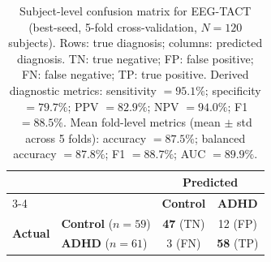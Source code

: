\begin{table}[ht]
\centering
\caption{Subject-level confusion matrix for EEG-TACT (best-seed, 5-fold cross-validation, $N = 120$ subjects). Rows: true diagnosis; columns: predicted diagnosis. TN: true negative; FP: false positive; FN: false negative; TP: true positive. Derived diagnostic metrics: sensitivity $= 95.1\%$; specificity $= 79.7\%$; PPV $= 82.9\%$; NPV $= 94.0\%$; F1 $= 88.5\%$. Mean fold-level metrics (mean $\pm$ std across 5 folds): accuracy $= 87.5\%$; balanced accuracy $= 87.8\%$; F1 $= 88.7\%$; AUC $= 89.9\%$.}
\label{tab:subject_cm}
\begin{tabular}{llcc}
\toprule
& & \multicolumn{2}{c}{\textbf{Predicted}} \\
\cmidrule(lr){3-4}
& & \textbf{Control} & \textbf{ADHD} \\
\midrule
\multirow{2}{*}{\textbf{Actual}}
  & \textbf{Control} ($n = 59$) & \textbf{47} (TN) & 12 (FP) \\
  & \textbf{ADHD}    ($n = 61$)    & 3 (FN)            & \textbf{58} (TP) \\
\bottomrule
\end{tabular}
\end{table}
